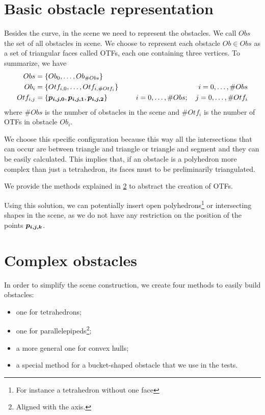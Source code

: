 \documentclass[dissertation.tex]{subfiles}
\begin{document}
\section{Basic obstacle representation}
Besides the curve, in the scene we need to represent the obstacles. We
call $Obs$ the set of all obstacles in scene. We choose to represent
each obstacle $Ob\in Obs$ as a set of triangular faces called
\acp{OTF}, each one containing three vertices. To summarize, we have
\begin{equation*}
  \begin{split}
    Obs&=\{Ob_0,\dots,Ob_{\#Obs}\}\\
    Ob_i&=\{Otf_{i,0},\dots,Otf_{i,\#Otf_i}\}&i=0,\dots,\#Obs\\
    Otf_{i,j}&=\{\boldsymbol{p_{i,j,0}},\boldsymbol{p_{i,j,1}},\boldsymbol{p_{i,j,2}}\}\quad\qquad&
    i=0,\dots,\#Obs;\quad j=0,\dots,\#Otf_i
  \end{split}
\end{equation*}
where $\#Obs$ is the number of obstacles in the scene and $\#Otf_i$ is
the number of \acp{OTF} in obstacle $Ob_i$.

We choose this specific configuration because this way all the
intersections that can occur are between triangle and triangle or
triangle and segment and they can be easily calculated. This implies
that, if an obstacle is a polyhedron more complex than just a
tetrahedron, its faces must to be preliminarily triangulated.

We provide the methods explained in \cref{sec:complexObs} to
abstract the creation of \acp{OTF}.

Using this solution, we can potentially insert open
polyhedrons\footnote{For instance a tetrahedron without one
  face} or intersecting shapes in the scene, as we do not have
any restriction on the position of the points $\boldsymbol{p_{i,j,k}}$.

\section{Complex obstacles}\label{sec:complexObs}
In order to simplify the scene construction, we create four methods to
easily build obstacles:
\begin{itemize}
\item one for tetrahedrons;
\item one for parallelepipeds\footnote{Aligned with the axis.};  
\item a more general one for convex hulls;
\item a special method for a bucket-shaped obstacle that
  we use in the tests.
\end{itemize}
\end{document}
